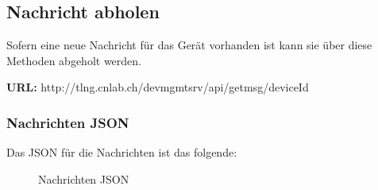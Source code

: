 \subsection{Nachricht abholen}

Sofern eine neue Nachricht für das Gerät vorhanden ist kann sie über diese Methoden abgeholt werden.

{\bf URL: }http://tlng.cnlab.ch/devmgmtsrv/api/getmsg/{deviceId}

\subsubsection{Nachrichten JSON}
Das JSON für die Nachrichten ist das folgende:
\begin{figure}[H]
	\centering
	
	\caption{Nachrichten JSON}
\end{figure}


